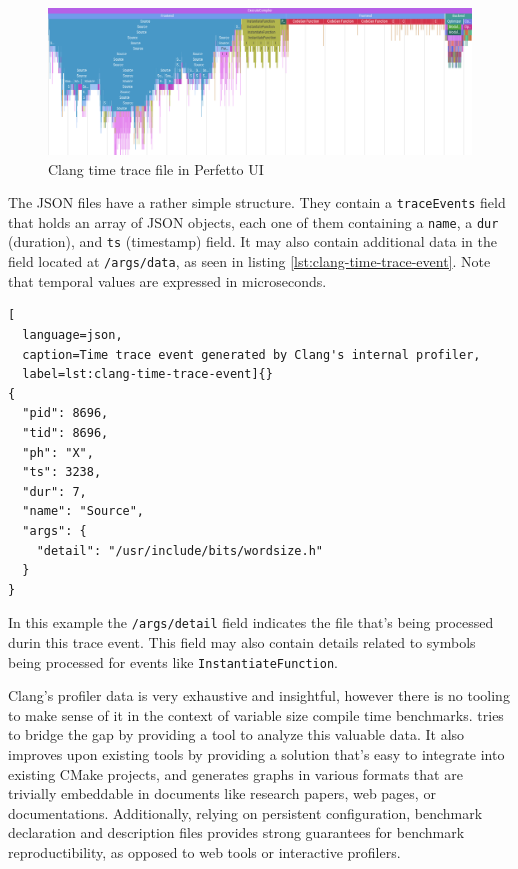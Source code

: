 \documentclass[../main]{subfiles}
\begin{document}
\begin{figure}[h]
\includegraphics[scale=0.264]{images/perfetto-ui.png}
\caption{Clang time trace file in Perfetto UI}
\label{fig:perfetto-time-trace-ui}
\end{figure}

The JSON files have a rather simple structure. They contain a
\lstinline{traceEvents} field that holds an array of JSON objects, each one of
them containing a \lstinline{name}, a \lstinline{dur} (duration), and
\lstinline{ts} (timestamp) field. It may also contain additional data in the
field located at \lstinline{/args/data}, as seen in listing
\ref{lst:clang-time-trace-event}. Note that temporal values are expressed in
microseconds.

\begin{lstlisting}[
  language=json,
  caption=Time trace event generated by Clang's internal profiler,
  label=lst:clang-time-trace-event]{}
{
  "pid": 8696,
  "tid": 8696,
  "ph": "X",
  "ts": 3238,
  "dur": 7,
  "name": "Source",
  "args": {
    "detail": "/usr/include/bits/wordsize.h"
  }
}
\end{lstlisting}

In this example the \lstinline{/args/detail} field indicates the file that's
being processed durin this trace event. This field may also contain details
related to symbols being processed for events like
\lstinline{InstantiateFunction}.

Clang's profiler data is very exhaustive and insightful, however there is no
tooling to make sense of it in the context of variable size compile time
benchmarks. \ctbench tries to bridge the gap by providing a tool to analyze
this valuable data. It also improves upon existing tools by providing a solution
that's easy to integrate into existing CMake projects, and generates graphs in
various formats that are trivially embeddable in documents like research papers,
web pages, or documentations. Additionally, relying on persistent configuration,
benchmark declaration and description files provides strong guarantees for
benchmark reproductibility, as opposed to web tools or interactive profilers.
\end{document}
